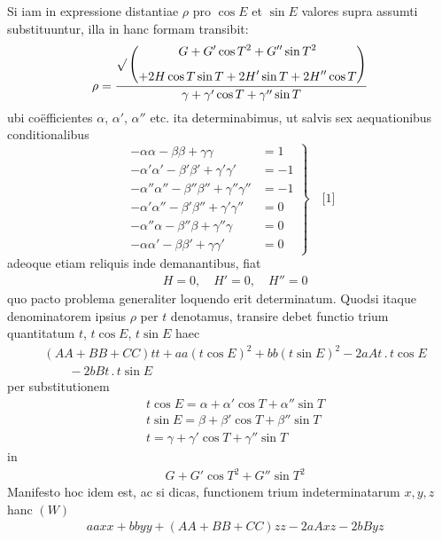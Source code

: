Si iam in expressione distantiae $\rho$ pro $\cos E$ et $\sin E$ valores supra assumti
substituuntur, illa in hanc formam transibit:
\[
\rho=\frac{\surd\left(\begin{gathered}G+G'\cos T^2+G''\sin T^2\\[5pt]
+2H\cos T\sin T+2H'\sin T+2H''\cos T\end{gathered}\right)}{\gamma+\gamma'\cos T+\gamma''\sin T}
\]
ubi coëfficientes $\alpha$, $\alpha'$, $\alpha''$ etc. ita determinabimus, ut salvis sex aequationibus
conditionalibus
\[
\left.\begin{aligned}
-\alpha\alpha-\beta\beta+\gamma\gamma&=1\\[5pt]
-\alpha'\alpha'-\beta'\beta'+\gamma'\gamma'&=-1\\[5pt]
-\alpha''\alpha''-\beta''\beta''+\gamma''\gamma''&=-1\\[5pt]
-\alpha'\alpha''-\beta'\beta''+\gamma'\gamma''&=0\\[5pt]
-\alpha''\alpha-\beta''\beta+\gamma''\gamma&=0\\[5pt]
-\alpha\alpha'-\beta\beta'+\gamma\gamma'&=0
\end{aligned}\right\}\quad\text{[1]}
\]
adeoque etiam reliquis inde demanantibus, fiat
\[
\begin{aligned}
&H=0,\quad H'=0,\quad H''=0
\end{aligned}
\]
quo pacto problema generaliter loquendo erit determinatum. Quodsi itaque denominatorem ipsius $\rho$ per $t$ denotamus, transire debet functio trium quantitatum $t$, $t\cos E$, $t\sin E$ haec
\[
\begin{aligned}
&(AA+BB+CC)tt+aa(t\cos E)^2+bb(t\sin E)^2-2aAt\, .\, t\cos E\\[6pt]
&\qquad{}-2bBt\, .\, t\sin E
\end{aligned}
\]
per substitutionem
\[
\begin{aligned}
&t\cos E=\alpha+\alpha'\cos T+\alpha''\sin T\\[6pt]
&t\sin E=\beta+\beta'\cos T+\beta''\sin T\\[6pt]
&t=\gamma+\gamma'\cos T+\gamma''\sin T
\end{aligned}
\]
in
\[
\begin{aligned}
&G+G'\cos T^2+G''\sin T^2
\end{aligned}
\]
Manifesto hoc idem est, ac si dicas, functionem trium indeterminatarum $x,y,z$
hanc $(W)$
\[
\begin{aligned}
&aaxx+bbyy+(AA+BB+CC)zz-2aAxz-2bByz
\end{aligned}
\]
